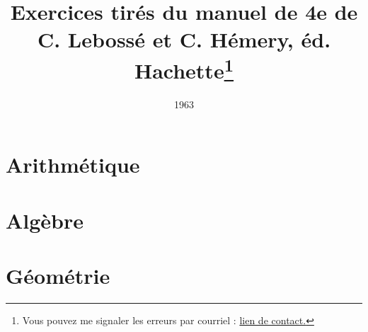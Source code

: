 \documentclass[12 pt]{report}
\author{ }
\title{\Large Exercices tirés du manuel de 4e de C. Lebossé et C. Hémery, éd. Hachette\footnote{Vous pouvez me signaler les erreurs par courriel : \href{mailto:leturcq.d@orange.fr}{lien de contact.} 
	}
	}
\date{1963}
\theoremstyle{plain}
\newcounter{n}
\begin{document}
	\maketitle 
	
	
	
\part{Arithmétique}
 
 
 
 
 \part{Algèbre}
 
 
 
 
 
 
 
 

 
 
 
 
  
 
 
 
 


\part{Géométrie}
\setcounter{n}{1}
 
 
 
 
 
 
 
 
% 
% 
% 
% 
% 
% 
% 
% 
% 
% 
% 
% 
% 
% 



% 
% 
% 
% 
 
 	
\end{document}
